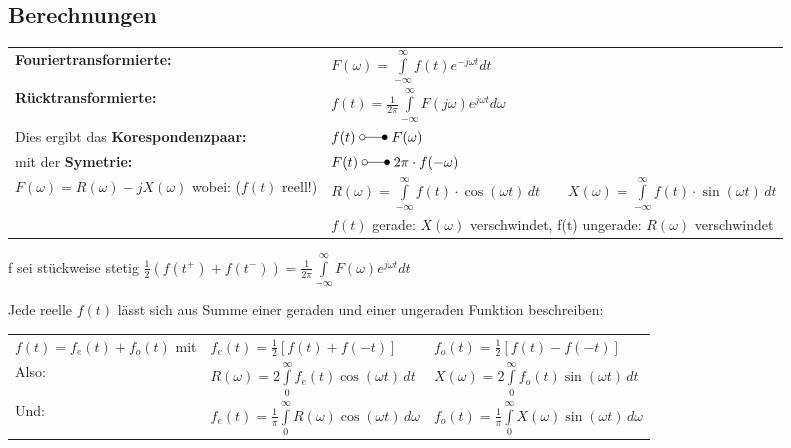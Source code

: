 	\subsection{Berechnungen}%
		\vspace{-2mm}	%
		\begin{tabular}{|p{6cm} l|} \hline
			\textbf{Fouriertransformierte:} &
			$F(\omega) = \int\limits_{-\infty}^{\infty} f(t)e^{-j\omega t}dt$ \\
			\textbf{Rücktransformierte:} &
			$f(t) = \frac{1}{2\pi}\int\limits_{-\infty}^{\infty}F(j\omega)e^{j\omega t}d\omega$ \\ \hline
		
		Dies ergibt das \textbf{Korespondenzpaar:} & $f(t) \; \laplace \; F(\omega)$ \\
		mit der \textbf{Symetrie:} & $F(t) \; \laplace \; 2\pi \cdot f(-\omega)$ \\
		
		$F(\omega) = R(\omega) -jX(\omega)$ wobei: ($f(t)$ reell!) &
		$R(\omega) = \int\limits_{-\infty}^\infty f(t)\cdot \cos(\omega t)\,dt \quad\quad X(\omega) =
		\int\limits_{-\infty}^\infty f(t)\cdot \sin(\omega t)\,dt$
		\\
		&$f(t)$ gerade: $X(\omega)$ verschwindet, f(t) ungerade: $R(\omega)$ verschwindet \\
		\hline
		\end{tabular}
		
		f sei stückweise stetig $\frac{1}{2}(f(t^+) + f(t^-)) = \frac{1}{2\pi} \int\limits_{-\infty}^{\infty}F(\omega)e^{j\omega t} dt$
		
		Jede reelle $f(t)$ lässt sich aus Summe einer geraden und einer ungeraden Funktion beschreiben:\\[3mm]
		\begin{tabular}{lll}
			$f(t) = f_e(t) + f_o(t)$ mit & $f_e(t) = \frac{1}{2}[f(t) + f(-t)]$ & $f_o(t) = \frac{1}{2}[f(t) - f(-t)]$ \\[3mm]
			
			Also: & $R(\omega) = 2 \int\limits_0^\infty f_e(t) \cos(\omega t)\,dt$ & $X(\omega) = 2 \int\limits_0^\infty
			f_o(t) \sin(\omega t)\,dt$ \\[3mm]
			
			Und: & $f_e(t) = \frac{1}{\pi}\int\limits_0^\infty R(\omega)\cos(\omega t)\,d\omega$ & 
			$f_o(t) = \frac{1}{\pi}\int\limits_0^\infty X(\omega)\sin(\omega t)\,d\omega$ \\[3mm]
		\end{tabular}
		
